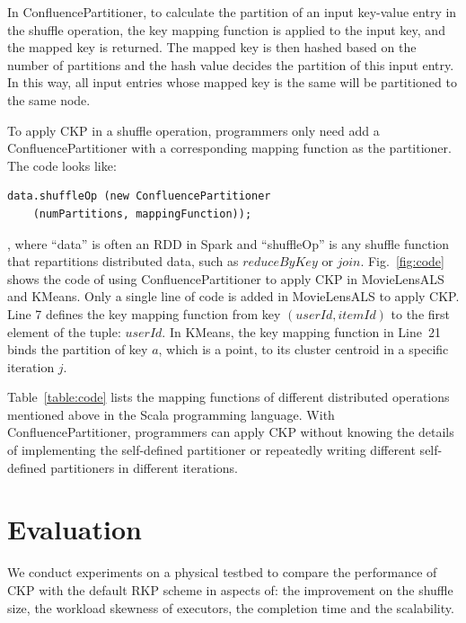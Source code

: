 \documentclass[10pt,journal,compsoc]{IEEEtran}
\begin{document}
In ConfluencePartitioner, to calculate the partition of an input key-value entry in the shuffle operation, 
the key mapping function is applied to the input key, 
and the mapped key is returned. 
The mapped key is then hashed based on the number of partitions 
and the hash value decides the partition of this input entry. 
In this way, all input entries whose mapped key is the same will be partitioned to the same node.


To apply CKP in a shuffle operation, programmers only need 
add a ConfluencePartitioner with a corresponding 
mapping function as the partitioner. 
The code looks like:
\begin{lstlisting}
data.shuffleOp (new ConfluencePartitioner 
    (numPartitions, mappingFunction));
\end{lstlisting}
, where ``data'' is often an RDD in Spark and ``shuffleOp'' is any shuffle function that repartitions distributed data, such as $reduceByKey$ or $join$. 
Fig.~\ref{fig:code} shows the code of using ConfluencePartitioner
to apply CKP in MovieLensALS and KMeans.
Only a single line of code is added in MovieLensALS to apply CKP.
Line 7 defines the key mapping function from key $(userId, itemId)$ to the first element of the tuple: $userId$.
In KMeans, the key mapping function in Line~21 binds the partition of 
key $a$, which is a point, to its cluster centroid in a specific iteration $j$.


Table~\ref{table:code} lists the mapping functions of different distributed operations mentioned above in the Scala programming language.
With ConfluencePartitioner, programmers can apply CKP without knowing
the details of implementing the self-defined partitioner or repeatedly
writing different self-defined partitioners in different iterations.


\section{Evaluation}\label{section:evaluation}
We conduct experiments on a physical testbed to compare the performance
of CKP with the default RKP scheme in aspects of: the improvement on the
shuffle size, the workload skewness of executors, the completion time
and the scalability.
\end{document}
